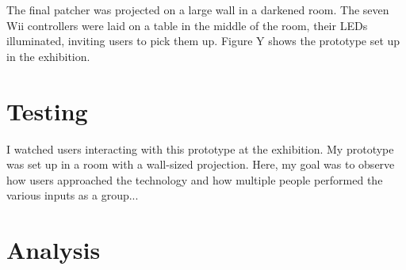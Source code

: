 The final patcher was projected on a large wall in a darkened room. The seven Wii controllers were laid on a table in the middle of the room, their LEDs illuminated, inviting users to pick them up. Figure Y shows the prototype set up in the exhibition.



\section{Testing}

I watched users interacting with this prototype at the exhibition. My prototype was set up in a room with a wall-sized projection. Here, my goal was to observe how users approached the technology and how multiple people performed the various inputs as a group...


\section{Analysis}
